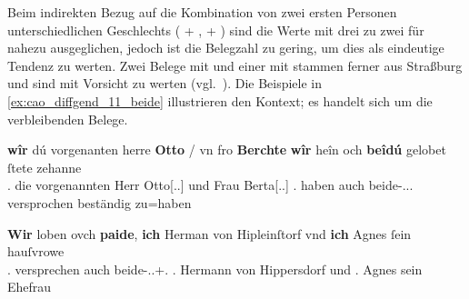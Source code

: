 Beim indirekten Bezug auf die Kombination von zwei ersten Personen
unterschiedlichen Geschlechts (\Fsg\subM{} + \Fsg\subF, \Fsg\subF{} +
\Fsg\subM) sind die Werte mit drei zu zwei für  nahezu ausgeglichen,
jedoch ist die Belegzahl zu gering, um dies als eindeutige Tendenz zu werten.
Zwei Belege mit   und einer mit 
 stammen ferner aus Straßburg und sind mit Vorsicht zu werten
(vgl.~). Die Beispiele in
\cref{ex:cao_diffgend_11_beide} %
illustrieren den Kontext; es handelt sich um die verbleibenden Belege.

\begin{exe}
\ex \label{ex:cao_diffgend_11_beide}
	\begin{xlist}
	\ex \label{ex:cao_diffgend_11_beide_1}
		\gll \textbf{wîr} dú vorgenanten herre \textbf{Otto} / vn fro \textbf{Berchte}
				\textelp{} \textbf{wîr} heîn och \textbf{beîdú} \textelp{}
				gelobet ſtete zehanne \\
			\Fpl\subMF.\Nom{} die vorgenannten Herr Otto[\Nom.\Sg.\MascM] {}
				und Frau Berta[\Nom.\Sg.\FemF] {} \Fpl\subMF.\Nom{} haben
				auch beide-\Nom.\Pl.\NeutMF.\St{} {} versprochen beständig
				zu=haben \\
		\begin{taggedline}{\parencites(Basel, 1298)[\pno~2931, 223.1--6]{cao4}}
		\trans {}
		\end{taggedline}

	\ex \label{ex:cao_diffgend_11_beide_2}
		\gll \textbf{Wir} loben ovch \textbf{paide}, \textbf{ich} Herman von
			Hipleinſtorf vnd \textbf{ich} Agnes ſein hauſvrowe \textelp{} \\
			\Fpl\subMF.\Nom{} versprechen auch beide-\Nom.\Pl.\M+\F\subMF.\St{}
			\Fsg\subM.\Nom{} Hermann von Hippersdorf und \Fsg\subF.\Nom{}
			Agnes sein Ehefrau {} \\
		\begin{taggedline}{\parencites(Wien, 1295)[\pno~N~701, 506.32--33]{cao5}}
		\trans {}
		\end{taggedline}
	\end{xlist}
\end{exe}


